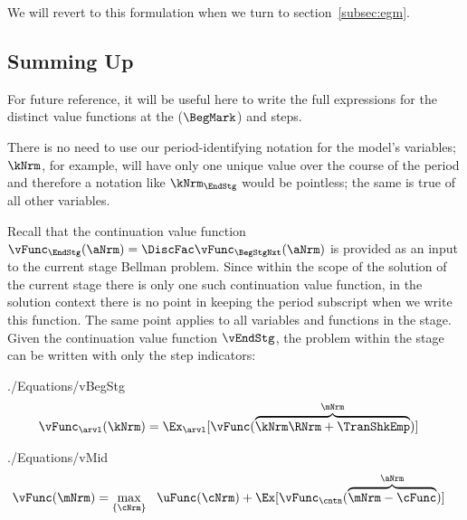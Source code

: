 \documentclass[\econtexRoot/SolvingMicroDSOPs]{subfiles}
\begin{document}
We will revert to this formulation when we turn to section~\ref{subsec:egm}.

\hypertarget{summing-up}{}
\subsection{Summing Up}\label{subsec:summing-up}
For future reference, it will be useful here to write the full expressions for the distinct value functions at the {\Arrival} ($\BegMark$) and {\Decision} {steps}.  %

There is no need to use our {period}-identifying notation for the model's variables; $\kNrm$, for example, will have only one unique value over the course of the {period} and therefore a notation like $\kNrm_{\EndStg}$ would be pointless; the same is true of all other variables.

Recall that the continuation value function $\vFunc_{\EndStg}(\aNrm)=\DiscFac \vFunc_{\BegStgNxt}(\aNrm)$ is provided as an input to the current {stage} Bellman problem.  Since within the scope of the solution of the current {stage} there is only one such continuation value function, in the solution context there is no point in keeping the {period} subscript when we write this function.  The same point applies to all variables and functions in the {stage}.  Given the continuation value function $\vEndStg$, the problem within the {stage} can be written with only the {step} indicators:
\begin{verbatimwrite}{./Equations/vBegStg}
  \begin{equation}\begin{gathered}\begin{aligned}
        \vFunc_{\arvl}(\kNrm) & = \Ex_{\arvl}[\vFunc(\overbrace{\kNrm \RNrm + \TranShkEmp}^{\mNrm})]  \label{eq:vBegStg}
      \end{aligned}\end{gathered}\end{equation}
\end{verbatimwrite}
\unskip
\begin{verbatimwrite}{./Equations/vMid}
  \begin{equation}\begin{gathered}\begin{aligned}
        \vFunc(\mNrm) & = \max_{\{{\cNrm}\}}~~\uFunc(\cNrm) +\Ex[ \vFunc_{\cntn}(\overbrace{\mNrm-\cFunc}^{\aNrm})] \label{eq:vMid}
      \end{aligned}\end{gathered}\end{equation}
\end{verbatimwrite}
\unskip
\end{document}
